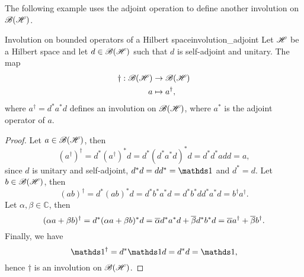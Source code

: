 The following example uses the adjoint operation to define another involution on \(\mathscr{B}(\mathscr{H})\).
\begin{example}{Involution on bounded operators of a Hilbert space}{involution_adjoint}
    Let \(\mathscr{H}\) be a Hilbert space and let \(d \in \mathscr{B}(\mathscr{H})\) such that \(d\) is self-adjoint and unitary. The map
    \begin{align*}
        \dag : \mathscr{B}(\mathscr{H}) &\to \mathscr{B}(\mathscr{H})\\
                                a &\mapsto a^\dag,
    \end{align*}
    where \(a^\dag = d^* a^* d\) defines an involution on \(\mathscr{B}(\mathscr{H})\), where \(a^*\) is the adjoint operator of \(a\).
\end{example}
\begin{proof}
    Let \(a \in \mathscr{B}(\mathscr{H})\), then
    \begin{equation*}
        (a^\dag)^\dag = d^* (a^\dag)^* d = d^* (d^* a^* d)^* d = d^* d^* a d d = a,
    \end{equation*}
    since \(d\) is unitary and self-adjoint, \(d^* d = d d^* = \unity\) and \(d^* = d\). Let \(b \in \mathscr{B}(\mathscr{H})\), then
    \begin{equation*}
        (ab)^\dag = d^*(ab)^* d = d^* b^* a^* d = d^* b^* d d^* a^* d = b^\dag a^\dag.
    \end{equation*}
    Let \(\alpha, \beta \in \mathbb{C}\), then
    \begin{equation*}
        (\alpha a + \beta b)^\dag = d^* (\alpha a + \beta b)^* d = \overline{\alpha} d^* a^* d + \overline{\beta} d^* b^* d = \overline{\alpha} a^\dag + \overline{\beta} b^\dag.
    \end{equation*}
    Finally, we have
    \begin{equation*}
        \unity^\dag = d^* \unity d = d^* d = \unity,
    \end{equation*}
    hence \(\dag\) is an involution on \(\mathscr{B}(\mathscr{H})\).
\end{proof}

